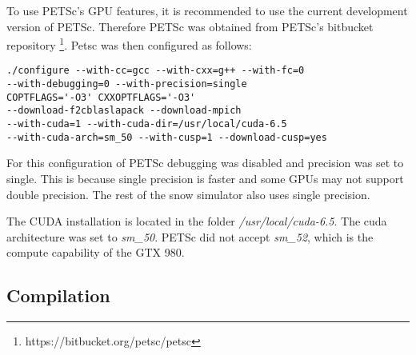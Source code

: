 To use PETSc's GPU features, it is recommended to use the current development 
version of PETSc. Therefore PETSc was obtained from PETSc's bitbucket repository
\footnote{https://bitbucket.org/petsc/petsc}. Petsc was then configured as follows:
\lstset{language=bash}
\begin{lstlisting}
./configure --with-cc=gcc --with-cxx=g++ --with-fc=0
--with-debugging=0 --with-precision=single
COPTFLAGS='-O3' CXXOPTFLAGS='-O3' 
--download-f2cblaslapack --download-mpich
--with-cuda=1 --with-cuda-dir=/usr/local/cuda-6.5 
--with-cuda-arch=sm_50 --with-cusp=1 --download-cusp=yes
\end{lstlisting}
For this configuration of PETSc debugging was disabled and precision was set to 
single. This is because single precision is faster and some GPUs may not support 
double precision. The rest of the snow simulator also uses single precision.

The CUDA installation is located in the folder \emph{/usr/local/cuda-6.5}. The 
cuda architecture was set to \emph{sm\_50}. PETSc did not accept \emph{sm\_52}, 
which is the compute capability of the GTX 980. 

\subsection{Compilation}


